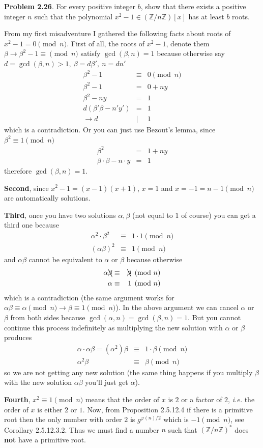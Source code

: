 \documentclass[aps,preprint,preprintnumbers,nofootinbib,showpacs,prd]{revtex4-1}
\newcommand{\ie}{{\it i.e.} }
\newcommand{\nbea}{\begin{eqnarray*}}
\newcommand{\neea}{\end{eqnarray*}}
\begin{document}
{\bf Problem 2.26}. For every positive integer $b$, show that there exists a positive integer $n$ such that the polynomial $x^2 - 1 \in (\mathbb{Z}/n\mathbb{Z})[x]$ has at least $b$ roots.

From my first misadventure I gathered the following facts about roots of $x^2 - 1 = 0 \pmod{n}$. First of all, the roots of $x^2 - 1$, denote them $\beta  \to \beta^2 - 1 \equiv \pmod{n}$ satisfy $\gcd(\beta,n)=1$ because otherwise say $d = \gcd(\beta,n) > 1,~\beta=d\beta',~n=dn'$
%
\nbea
\beta^2 - 1 & \equiv & 0 \pmod{n} \\
\beta^2 - 1 & = & 0 + ny \\
\beta^2 - ny & = & 1 \\
d(\beta'\beta - n'y') & = & 1 \\
\to d&|&1
\neea
%
which is a contradiction. Or you can just use Bezout's lemma, since $\beta^2 \equiv 1 \pmod{n}$
%
\nbea
\beta^2 & = & 1 + ny \\
\beta\cdot \beta - n\cdot y & = & 1
\neea
%
therefore $\gcd(\beta,n)=1$.

{\bf Second}, since $x^2 - 1 = (x-1)(x+1)$, $x=1$ and $x=-1=n-1 \pmod{n}$ are automatically solutions.

{\bf Third}, once you have two solutions $\alpha,\beta$ (not equal to $1$ of course) you can get a third one because
%
\nbea
\alpha^2 \cdot \beta^2 & \equiv & 1 \cdot 1 \pmod{n} \\
(\alpha\beta)^2 & \equiv & 1 \pmod{n}
\neea
%
and $\alpha\beta$ cannot be equivalent to $\alpha$ or $\beta$ because otherwise
%
\nbea
\alpha\bcancel{\beta} & \equiv & \bcancel{\beta} \pmod{n} \\
\alpha & \equiv & 1 \pmod{n}
\neea
%
which is a contradiction (the same argument works for $\alpha\beta \equiv \alpha \pmod{n} \to \beta \equiv 1 \pmod{n}$). In the above argument we can cancel $\alpha$ or $\beta$ from both sides because $\gcd(\alpha,n) = \gcd(\beta,n) = 1$. But you cannot continue this process indefinitely as multiplying the new solution with $\alpha$ or $\beta$ produces
%
\nbea
\alpha \cdot \alpha\beta = (\alpha^2)\beta & \equiv & 1 \cdot \beta \pmod{n} \\
\alpha^2\beta & \equiv & \beta \pmod{n}
\neea
%
so we are not getting any new solution (the same thing happens if you multiply $\beta$ with the new solution $\alpha\beta$ you'll just get $\alpha$).

{\bf Fourth}, $x^2 \equiv 1 \pmod{n}$ means that the order of $x$ is $2$ or a factor of $2$, \ie the order of $x$ is either $2$ or $1$. Now, from Proposition 2.5.12.4 if there is a primitive root then the only number with order $2$ is $g^{\varphi(n)/2}$ which is $-1 \pmod{n}$, see Corollary 2.5.12.3.2. Thus we must find a number $n$ such that $(\mathbb{Z}/n\mathbb{Z})^*$ does {\bf not} have a primitive root. 
\end{document}
